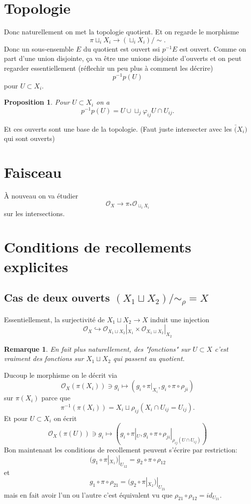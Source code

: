 \documentclass[a4paper,12pt]{book}
\newcommand{\Or}{\mathcal{O}}
\theoremstyle{plain}
\newtheorem{prop}[subsection]{Proposition}
\newtheorem{rem}{Remarque}
\theoremstyle{definition}
\theoremstyle{remark}
\begin{document}
\section{Topologie}
Donc naturellement on met la topologie quotient. Et
on regarde le morphisme 
\[\pi \sqcup_i X_i\to(\sqcup_i X_i)/\sim.\]
Donc un sous-ensemble $E$ du quotient est ouvert
ssi $p^{-1}E$ est ouvert. Comme on part d'une union
disjointe, ça va être une unione disjointe d'ouverts
et on peut regarder essentiellement (réflechir
un peu plus à comment les décrire)
\[p^{-1}p(U)\]
pour $U\subset X_i$.
\begin{prop}
  Pour $U\subset X_i$ on a
  \[p^{-1}p(U)=U\cup \sqcup_j \varphi_{ij}U\cap U_{ij}.\]
\end{prop}
Et ces ouverts sont une base de la topologie. (Faut juste
intersecter avec les $\bar(X_i)$ qui sont ouverts)
\section{Faisceau}
À nouveau on va étudier 
\[\Or_X\to \pi_*\Or_{\sqcup_i X_i}\]
sur les intersections.


\section{Conditions de recollements explicites}
\subsection{Cas de deux ouverts $(X_1\sqcup X_2)/\sim_\rho=X$}
Essentiellement, la surjectivité de $X_1\sqcup X_2\to X$
induit une injection 
\[\Or_X\hookrightarrow \Or_{X_1\sqcup X_2}|_{X_1}\times \Or_{X_1\sqcup X_2}|_{X_2}\]
\begin{rem}
  En fait plus naturellement, des "fonctions" sur $U\subset X$
  c'est vraiment des fonctions sur $X_1\sqcup X_2$ qui 
  passent au quotient.
\end{rem}
Ducoup le morphisme on le décrit via 
\[\Or_{X}(\pi(X_i))\ni g_i\mapsto (g_i\circ \pi|_{X_i},g_i\circ \pi\circ \rho_{ji})\]
sur $\pi(X_i)$ parce que 
\[\pi^{-1}(\pi(X_i))=X_i\sqcup \rho_{ij}(X_i\cap U_{ij}=U_{ij}).\]
Et pour $U\subset X_i$ on écrit 
\[\Or_{X}(\pi(U))\ni g_i\mapsto (g_i\circ \pi|_{U},g_i\circ \pi\circ \rho_{ji}|_{\rho_{ij}(U\cap U_{ij})})\]
Bon maintenant les conditions de recollement peuvent s'écrire par
restriction:
\[(g_1\circ\pi|_{X_1})|_{U_{12}}=g_2\circ\pi\circ \rho_{12}\]
et 
\[g_1\circ\pi\circ \rho_{21}=(g_2\circ\pi|_{X_2})|_{U_{21}}\]
mais en fait avoir l'un ou l'autre c'est équivalent vu que 
$\rho_{21}\circ\rho_{12}=id_{U_{21}}$.
\end{document}
